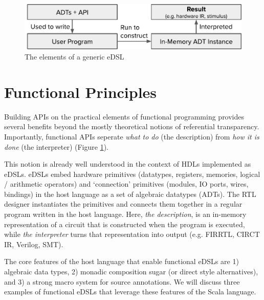 \documentclass[sigplan,review,nonacm,9pt]{acmart}
\begin{document}

\maketitle

\begin{figure}[h]
\includegraphics[width=\linewidth]{simcommand/functional_apis.pdf}
\caption{The elements of a generic eDSL}
\label{fig:functional_apis}
\end{figure}

\section{Functional Principles}

Building APIs on the practical elements of functional programming provides several benefits beyond the mostly theoretical notions of referential transparency\cite{fpinscala}.
Importantly, functional APIs seperate \textit{what to do} (the description) from \textit{how it is done} (the interpreter) (Figure \ref{fig:functional_apis}).

This notion is already well understood in the context of HDLs implemented as eDSLs.
eDSLs embed hardware primitives (datatypes, registers, memories, logical / arithmetic operators) and `connection' primitives (modules, IO ports, wires, bindings) in the host language as a set of algebraic datatypes (ADTs).
The RTL designer instantiates the primitives and connects them together in a regular program written in the host language.
Here, \textit{the description}, is an in-memory representation of a circuit that is constructed when the program is executed, while \textit{the interpreter} turns that representation into output (e.g. FIRRTL\cite{firrtl}, CIRCT\cite{circt} IR, Verilog, SMT).

The core features of the host language that enable functional eDSLs are 1) algebraic data types, 2) monadic composition sugar (or direct style alternatives\cite{dotty_cps_async, koka}), and 3) a strong macro system for source annotations.
We will discuss three examples of functional eDSLs that leverage these features of the Scala language.
\end{document}
